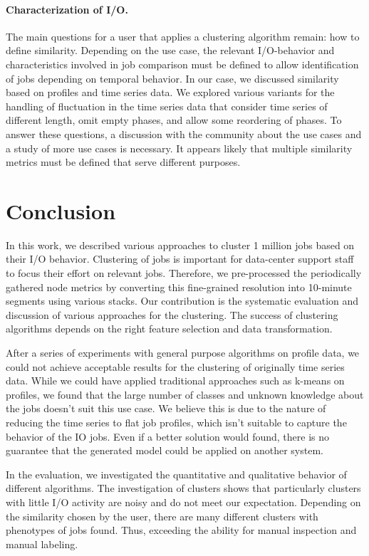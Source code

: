 \documentclass{jhps}
\begin{document}
{{{{\paragraph{Characterization of I/O.}
The main questions for a user that applies a clustering algorithm remain: how to define similarity.
Depending on the use case, the relevant I/O-behavior and characteristics involved in job comparison must be defined to allow identification of jobs depending on temporal behavior.
In our case, we discussed similarity based on profiles and time series data.
We explored various variants for the handling of fluctuation in the time series data that consider time series of different length, omit empty phases, and allow some reordering of phases.
To answer these questions, a discussion with the community about the use cases and a study of more use cases is necessary.
It appears likely that multiple similarity metrics must be defined that serve different purposes.


\section{Conclusion}%
\label{sec:conclusion}

In this work, we described various approaches to cluster 1 million jobs based on their I/O behavior.
Clustering of jobs is important for data-center support staff to focus their effort on relevant jobs.
Therefore, we pre-processed the periodically gathered node metrics by converting this fine-grained resolution into 10-minute segments using various stacks.
Our contribution is the systematic evaluation and discussion of various approaches for the clustering.
The success of clustering algorithms depends on the right feature selection and data transformation.

After a series of experiments with general purpose algorithms on profile data, we could not achieve acceptable results for the clustering of originally time series data.
While we could have applied traditional approaches such as k-means on profiles, we found that the large number of classes and unknown knowledge about the jobs doesn't suit this use case.
We believe this is due to the nature of reducing the time series to flat job profiles, which isn't suitable to capture the behavior of the IO jobs.
Even if a better solution would found, there is no guarantee that the generated model could be applied on another system.

In the evaluation, we investigated the quantitative and qualitative behavior of different algorithms.
The investigation of clusters shows that particularly clusters with little I/O activity are noisy and do not meet our expectation.
Depending on the similarity chosen by the user, there are many different clusters with phenotypes of jobs found.
Thus, exceeding the ability for manual inspection and manual labeling.

}}}}
\end{document}
